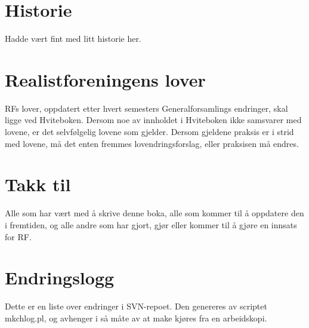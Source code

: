 \documentclass[11pt,norsk,a4paper,pointlessnumbers]{scrbook}
\begin{document}


\chapter{Historie}
Hadde vært fint med litt historie her.

\chapter{Realistforeningens lover}
RFs lover, oppdatert etter hvert semesters Generalforsamlings 
endringer, skal ligge ved Hviteboken. Dersom noe av innholdet
i Hviteboken ikke samsvarer med lovene, er det selvfølgelig
lovene som gjelder. Dersom gjeldene praksis er i strid med
lovene, må det enten fremmes lovendringsforslag, eller praksisen
må endres.


\chapter{Takk til}
Alle som har vært med å skrive denne boka, alle som kommer til å oppdatere den i fremtiden, og alle andre som har gjort, gjør eller kommer til å gjøre en innsats for RF.

\chapter{Endringslogg}
Dette er en liste over endringer i SVN-repoet. Den genereres av scriptet mkchlog.pl,
og avhenger i så måte av at make kjøres fra en arbeidskopi.


\end{document}
